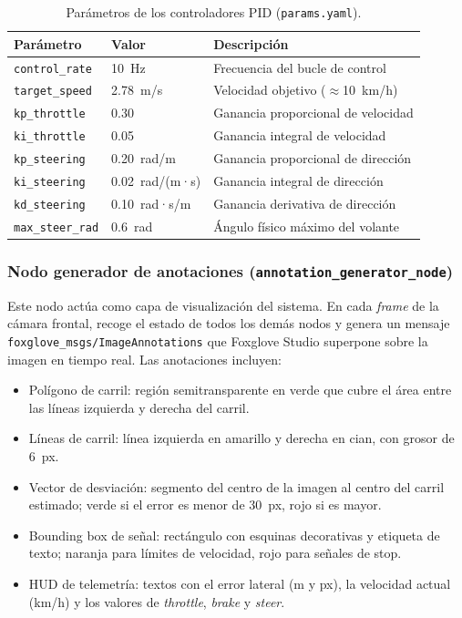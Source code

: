 \documentclass[12pt, a4paper]{article}
\begin{document}
\begin{table}[H]
    \centering
    \caption{Parámetros de los controladores PID (\texttt{params.yaml}).}
    \label{tab:pid}
    \begin{tabular}{lll}
        \toprule
        \textbf{Parámetro} & \textbf{Valor} & \textbf{Descripción} \\
        \midrule
        \texttt{control\_rate}   & 10~Hz          & Frecuencia del bucle de control \\
        \texttt{target\_speed}   & 2.78~m/s       & Velocidad objetivo ($\approx$10~km/h) \\
        \texttt{kp\_throttle}    & 0.30           & Ganancia proporcional de velocidad \\
        \texttt{ki\_throttle}    & 0.05           & Ganancia integral de velocidad \\
        \texttt{kp\_steering}    & 0.20~rad/m     & Ganancia proporcional de dirección \\
        \texttt{ki\_steering}    & 0.02~rad/(m·s) & Ganancia integral de dirección \\
        \texttt{kd\_steering}    & 0.10~rad·s/m   & Ganancia derivativa de dirección \\
        \texttt{max\_steer\_rad} & 0.6~rad        & Ángulo físico máximo del volante \\
        \bottomrule
    \end{tabular}
\end{table}

\subsubsection{Nodo generador de anotaciones (\texttt{annotation\_generator\_node})}

Este nodo actúa como capa de visualización del sistema. En cada \textit{frame} de la cámara frontal, recoge el estado de todos los demás nodos y genera un mensaje \texttt{foxglove\_msgs/\allowbreak ImageAnnotations} que Foxglove Studio superpone sobre la imagen en tiempo real. Las anotaciones incluyen:

\begin{itemize}
    \item Polígono de carril: región semitransparente en verde que cubre el área entre las líneas izquierda y derecha del carril.
    \item Líneas de carril: línea izquierda en amarillo y derecha en cian, con grosor de 6~px.
    \item Vector de desviación: segmento del centro de la imagen al centro del carril estimado; verde si el error es menor de 30~px, rojo si es mayor.
    \item Bounding box de señal: rectángulo con esquinas decorativas y etiqueta de texto; naranja para límites de velocidad, rojo para señales de stop.
    \item HUD de telemetría: textos con el error lateral (m y px), la velocidad actual (km/h) y los valores de \textit{throttle}, \textit{brake} y \textit{steer}.
\end{itemize}
\end{document}
